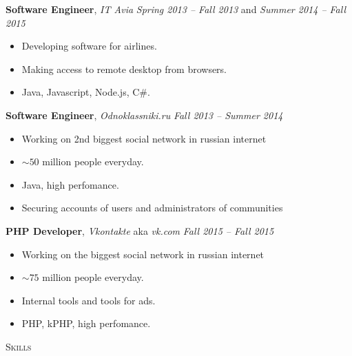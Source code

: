 \documentclass[12pt]{article}
\newenvironment{changemargin}[2]{%
  \begin{list}{}{%
    \setlength{\topsep}{0pt}%
    \setlength{\leftmargin}{#1}%
    \setlength{\rightmargin}{#2}%
    \setlength{\listparindent}{\parindent}%
    \setlength{\itemindent}{\parindent}%
    \setlength{\parsep}{\parskip}%
  }%
  \item[]}{\end{list}
}
\newcommand{\lineover}{
	\begin{changemargin}{-0.05in}{-0.05in}
		\vspace*{-8pt}
		\hrulefill \\
		\vspace*{-2pt}
	\end{changemargin}
}
\newcommand{\header}[1]{
	\begin{changemargin}{-0.5in}{-0.5in}
		\scshape{#1}\\
  	\lineover
	\end{changemargin}
}
\newenvironment{body} {
	\vspace*{-16pt}
	\begin{changemargin}{-0.25in}{-0.5in}
  }	
	{\end{changemargin}
}
\begin{document}
\begin{body}
	\vspace{14pt}
	\textbf{Software Engineer}, \emph{IT Avia} \hfill \emph{Spring 2013 -- Fall 2013} and \emph{Summer 2014 -- Fall 2015}\\
	\vspace*{-4pt}
	\begin{itemize} \itemsep -0pt  %
		\item Developing software for airlines.
		\item Making access to remote desktop from browsers.
		\item Java, Javascript, Node.js, C\#.
	\end{itemize}
	\smallskip
	\vspace{14pt}
	\textbf{Software Engineer}, \emph{Odnoklassniki.ru} \hfill \emph{Fall 2013 -- Summer 2014}\\
	\vspace*{-4pt}
	\begin{itemize} \itemsep -0pt  %
		\item Working on 2nd biggest social network in russian internet
		\item $\sim50$ million people everyday.
		\item Java, high perfomance.
		\item Securing accounts of users and administrators of communities
	\end{itemize}
	\vspace{14pt}
	\textbf{PHP Developer}, \emph{Vkontakte} aka \emph{vk.com} \hfill \emph{Fall 2015 -- Fall 2015}\\
	\vspace*{-4pt}
	\begin{itemize} \itemsep -0pt  %
		\item Working on the biggest social network in russian internet
		\item $\sim75$ million people everyday.
		\item Internal tools and tools for ads.
		\item PHP, kPHP, high perfomance.
	\end{itemize}
\end{body}

\smallskip


\header{Skills}
\end{document}
